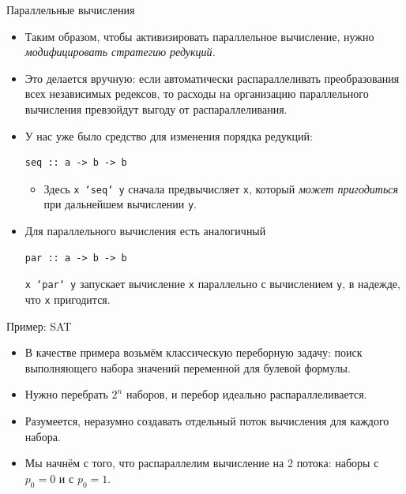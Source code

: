 \documentclass[xcolor=dvipsnames]{beamer}
\begin{document}
\begin{frame}[fragile]{Параллельные вычисления}

\begin{itemize}[<+->]
 \item Таким образом, чтобы активизировать параллельное вычисление, нужно {\em модифицировать стратегию редукций.}
 \item Это делается вручную: если автоматически распараллеливать преобразования всех независимых редексов, то расходы на организацию параллельного вычисления превзойдут выгоду от распараллеливания.
 \item У нас уже было средство для изменения порядка редукций:
 \begin{verbatim}
seq :: a -> b -> b
 \end{verbatim}
 \begin{itemize}
  \item Здесь \texttt{x `seq` y} сначала предвычисляет {\tt x}, который {\em может пригодиться} при дальнейшем вычислении {\tt y}.
 \end{itemize}
 \item Для параллельного вычисления есть аналогичный
\begin{verbatim}
par :: a -> b -> b
\end{verbatim}
\texttt{x `par` y} запускает вычисление {\tt x} параллельно с вычислением {\tt y}, в надежде, что {\tt x} пригодится.


\end{itemize}

 
\end{frame}

\begin{frame}[fragile]{Пример: SAT}

\begin{itemize}[<+->]
 \item В качестве примера возьмём классическую переборную задачу: поиск выполняющего набора значений переменной для булевой формулы.
 \item Нужно перебрать $2^n$ наборов, и перебор идеально распараллеливается.
 \item Разумеется, неразумно создавать отдельный поток вычисления для каждого набора.
 \item Мы начнём с того, что распараллелим вычисление на 2 потока: наборы с $p_0 = 0$ и с $p_0 = 1$.
\end{itemize}

 
 
\end{frame}
\end{document}
